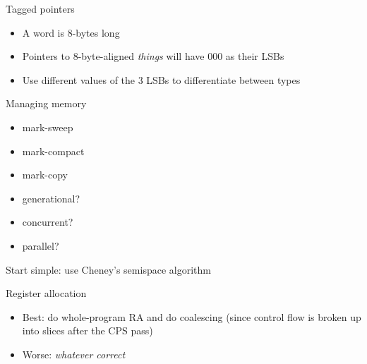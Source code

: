 \documentclass{beamer}
\begin{document}
\begin{frame}{Tagged pointers}
  \begin{itemize}
  \item A word is 8-bytes long
  \item Pointers to 8-byte-aligned \textit{things} will have 000 as their LSBs
  \item Use different values of the 3 LSBs to differentiate between types
  \end{itemize}
\end{frame}

\begin{frame}{Managing memory}
  \begin{itemize}
  \item mark-sweep
  \item mark-compact
  \item mark-copy
  \item generational?
  \item concurrent?
  \item parallel?
  \end{itemize}

  Start simple: use Cheney's semispace algorithm
\end{frame}

\begin{frame}{Register allocation}
  \begin{itemize}
  \item Best: do whole-program RA and do coalescing (since control flow is broken up into slices after the CPS pass)
  \item Worse: \textit{whatever correct}
  \end{itemize}
\end{frame}
\end{document}
